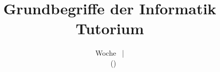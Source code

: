 
\usepackage[deutsch,titlepage0]{../TutTexbib/KIT/beamerthemeKITmod}

\usepackage{pdfpages}

\usepackage{libertine}

\usepackage{eulervm}
\renewcommand\ttdefault{cmtt} %

\usepackage[ngerman]{babel}



\usepackage{csquotes}



\setcounter{tocdepth}{1}

\usepackage[TS1,T1]{fontenc}

\usepackage{graphicx}


\usepackage{hyperref}
\hypersetup{bookmarksdepth=subsection} 

\usepackage{colortbl}
\usepackage[absolute,overlay]{textpos}
\usepackage{listings}
\usepackage{forloop}

\usepackage{tikz}
\usetikzlibrary{matrix}
\usetikzlibrary{arrows.meta}
\usetikzlibrary{automata}
\usetikzlibrary{tikzmark}

\usepackage{xspace}





\title[GBI-Tutorium \mytutnumber, Woche \theweeknum]{Grundbegriffe der Informatik \\ Tutorium \mytutnumber}

\subtitle{Woche \theweeknum \ | \mydate{\theweeknum} \\ \myname \ \  \normalfont (\mailto{\mymail})}
\author[\myname]{\myname}
\date{\mydate{\theweeknum}\ }

